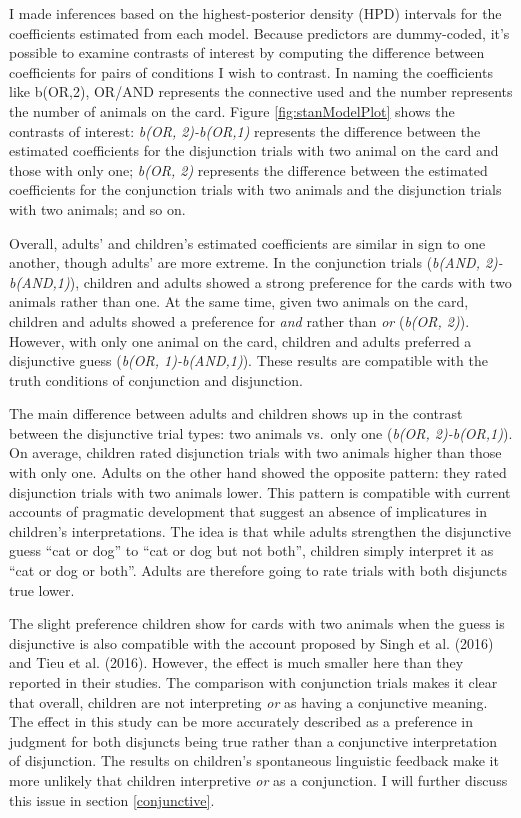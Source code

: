 \documentclass[oneside]{report}
\theoremstyle{definition}
\theoremstyle{definition}
\theoremstyle{definition}
\theoremstyle{remark}
\begin{document}
I made inferences based on the highest-posterior density (HPD) intervals
for the coefficients estimated from each model. Because predictors are
dummy-coded, it's possible to examine contrasts of interest by computing
the difference between coefficients for pairs of conditions I wish to
contrast. In naming the coefficients like b(OR,2), OR/AND represents the
connective used and the number represents the number of animals on the
card. Figure \ref{fig:stanModelPlot} shows the contrasts of interest:
\emph{b(OR, 2)-b(OR,1)} represents the difference between the estimated
coefficients for the disjunction trials with two animal on the card and
those with only one; \emph{b(OR, 2)} represents the difference between
the estimated coefficients for the conjunction trials with two animals
and the disjunction trials with two animals; and so on.

Overall, adults' and children's estimated coefficients are similar in
sign to one another, though adults' are more extreme. In the conjunction
trials (\emph{b(AND, 2)-b(AND,1)}), children and adults showed a strong
preference for the cards with two animals rather than one. At the same
time, given two animals on the card, children and adults showed a
preference for \emph{and} rather than \emph{or} (\emph{b(OR, 2)}).
However, with only one animal on the card, children and adults preferred
a disjunctive guess (\emph{b(OR, 1)-b(AND,1)}). These results are
compatible with the truth conditions of conjunction and disjunction.

The main difference between adults and children shows up in the contrast
between the disjunctive trial types: two animals vs.~only one
(\emph{b(OR, 2)-b(OR,1)}). On average, children rated disjunction trials
with two animals higher than those with only one. Adults on the other
hand showed the opposite pattern: they rated disjunction trials with two
animals lower. This pattern is compatible with current accounts of
pragmatic development that suggest an absence of implicatures in
children's interpretations. The idea is that while adults strengthen the
disjunctive guess ``cat or dog'' to ``cat or dog but not both'',
children simply interpret it as ``cat or dog or both''. Adults are
therefore going to rate trials with both disjuncts true lower.

The slight preference children show for cards with two animals when the
guess is disjunctive is also compatible with the account proposed by
Singh et al. (2016) and Tieu et al. (2016). However, the effect is much
smaller here than they reported in their studies. The comparison with
conjunction trials makes it clear that overall, children are not
interpreting \emph{or} as having a conjunctive meaning. The effect in
this study can be more accurately described as a preference in judgment
for both disjuncts being true rather than a conjunctive interpretation
of disjunction. The results on children's spontaneous linguistic
feedback make it more unlikely that children interpretive \emph{or} as a
conjunction. I will further discuss this issue in section
\ref{conjunctive}.
\end{document}
